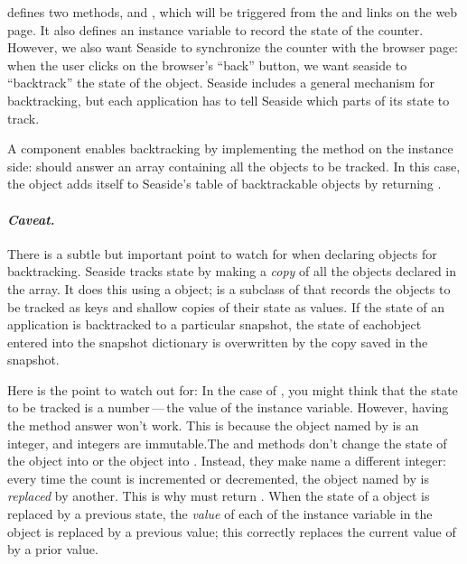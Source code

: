 \documentclass[a4paper,10pt,twoside]{book}
\begin{document}
 defines two methods,  and , which will be
triggered from the \link{++} and \link{--\,--} links on the web page.
It also defines an instance variable  to record the state of the counter.
However, we also want Seaside to synchronize the counter with the browser page:
when the user clicks on the browser's ``back'' button, we want seaside to ``backtrack''
the state of the  object.
Seaside includes a general mechanism for backtracking, but each application has to tell
Seaside which parts of its state to track.

A component enables backtracking by implementing the  method on the instance
side:
 should answer an array containing all the objects to be tracked.
In this case, the  object adds itself to Seaside's table of backtrackable
objects by returning .

\paragraph{\emph{Caveat.}}
There is a subtle but important point to watch for when declaring objects for
backtracking.
Seaside tracks state by making a \emph{copy} of all the objects declared in the
 array.
It does this using a  object;  is a subclass of
 that records the objects to be tracked as keys and shallow
copies of their state as values.
If the state of an application is backtracked to a particular snapshot, the state of eachobject entered into the snapshot dictionary is overwritten by the copy saved in the
snapshot.

Here is the point to watch out for:
In the case of , you might think that the state to be tracked is a
number\,---\,the value of the  instance variable.
However, having the  method answer  won't work.  
This is because the object named by  is an integer, and integers are
immutable.The  and  methods don't change the state of the
object 
into  or the object  into .
Instead, they make  name a different integer: 
every time the count is incremented or decremented, the object named by  is
\emph{replaced} by another.
This is why  must return .
When the state of a \mbox{} object is replaced by a previous state, the
\emph{value} of each of the instance variable in the object is replaced by a previous
value; this correctly replaces the current value of  by a prior value.
\end{document}
